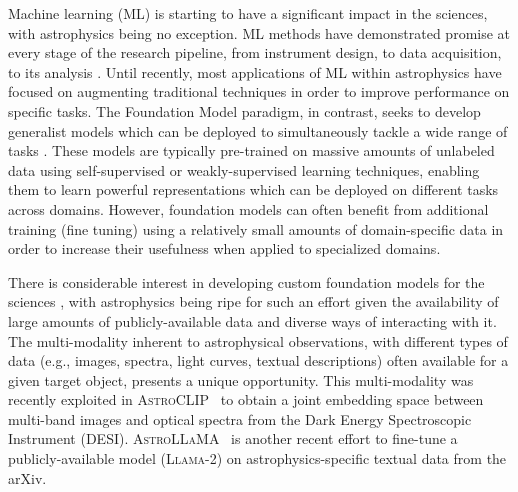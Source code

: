 \documentclass[10pt]{article} %
\begin{document}
Machine learning (ML) is starting to have a significant impact in the sciences, with astrophysics being no exception.
%
ML methods have demonstrated promise at every stage of the research pipeline, from instrument design, to data acquisition, to its analysis \citep{huertas2022dawes}.
%
Until recently, most applications of ML within astrophysics have focused on augmenting traditional techniques in order to improve performance on specific tasks.
%
The {Foundation Model} paradigm, in contrast, seeks to develop generalist models which can be deployed to simultaneously tackle a wide range of tasks \citep{bommasani2021opportunities}.
%
%
These models are typically pre-trained on massive amounts of unlabeled data using self-supervised or weakly-supervised learning techniques, enabling them to learn powerful representations which can be deployed on different tasks across domains.
%
However, foundation models can often benefit from additional training ({fine tuning}) using a relatively small amounts of domain-specific data in order to increase their usefulness when applied to specialized domains.

There is considerable interest in developing custom foundation models for the sciences \citep[e.g., ][]{batatia2023foundation,subramanian2023towards}, with astrophysics being ripe for such an effort given the availability of large amounts of publicly-available data and diverse ways of interacting with it.
%
The multi-modality inherent to astrophysical observations, with different types of data (e.g., images, spectra, light curves, textual descriptions) often available for a given target object, presents a unique opportunity.
%
This multi-modality was recently exploited in \textsc{AstroCLIP}~\citep{lanusse2023astroclip} to obtain a joint embedding space between multi-band images and optical spectra from the Dark Energy Spectroscopic Instrument (DESI).
%
\textsc{AstroLLaMA}~\citep{nguyen2023astrollama,perkowski2024astrollama} is another recent effort to fine-tune a publicly-available model (\textsc{Llama-2}) on astrophysics-specific textual data from the arXiv.
\end{document}
